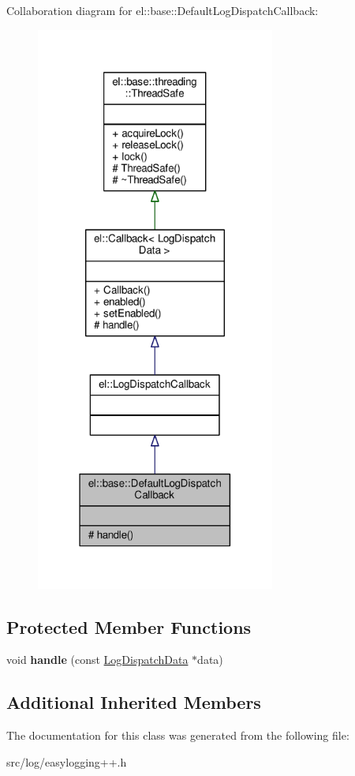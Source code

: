 Collaboration diagram for el\+:\+:base\+:\+:Default\+Log\+Dispatch\+Callback\+:
\nopagebreak
\begin{figure}[H]
\begin{center}
\leavevmode
\includegraphics[width=223pt]{d2/d7b/classel_1_1base_1_1DefaultLogDispatchCallback__coll__graph}
\end{center}
\end{figure}
\subsection*{Protected Member Functions}
\begin{DoxyCompactItemize}
\item 
void {\bfseries handle} (const \hyperlink{classel_1_1LogDispatchData}{Log\+Dispatch\+Data} $\ast$data)\hypertarget{classel_1_1base_1_1DefaultLogDispatchCallback_acdac30f202c245500e6d94c55eee6d95}{}\label{classel_1_1base_1_1DefaultLogDispatchCallback_acdac30f202c245500e6d94c55eee6d95}

\end{DoxyCompactItemize}
\subsection*{Additional Inherited Members}


The documentation for this class was generated from the following file\+:\begin{DoxyCompactItemize}
\item 
src/log/easylogging++.\+h\end{DoxyCompactItemize}
